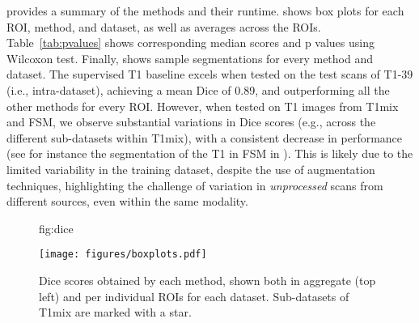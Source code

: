 \documentclass{midl}
\begin{document}
 provides a summary of the methods and their runtime.  shows box plots for each ROI, method, and dataset, as well as averages across the ROIs. Table~\ref{tab:pvalues} shows corresponding median scores and p values using Wilcoxon test. Finally,   shows sample segmentations for every method and dataset. The supervised T1 baseline excels when tested on the test scans of T1-39 (i.e., intra-dataset), achieving a mean Dice of 0.89, and outperforming all the other methods for every ROI. However, when tested on T1 images from T1mix and FSM, we observe substantial variations in Dice scores (e.g., across the different sub-datasets within T1mix), with a consistent decrease in performance (see for instance the segmentation of the T1 in FSM in ). This is likely due to the limited variability in the training dataset, despite the use of augmentation techniques, highlighting the challenge of variation in \textit{unprocessed} scans from different sources, even within the same modality.

\begin{figure}[t]
\floatconts
  {fig:dice}
  {\caption{Dice scores obtained by each method, shown both in aggregate (top left) and per individual ROIs for each dataset. Sub-datasets of T1mix are marked with a star.}}
  {\texttt{[image: figures/boxplots.pdf]}}
\end{figure}
\end{document}
